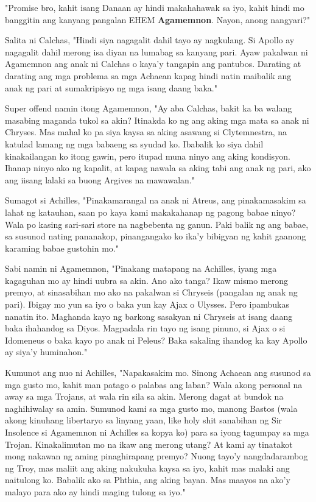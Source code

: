 \documentclass[12pt,letterpaper]{report}
\begin{document}
"Promise bro, kahit isang Danaan ay hindi makahahawak sa iyo,
kahit hindi mo banggitin ang kanyang pangalan EHEM \textbf{Agamemnon}. Nayon, anong nangyari?"

Salita ni Calchas, "Hindi siya nagagalit dahil tayo ay nagkulang.
Si Apollo ay nagagalit dahil merong isa diyan na lumabag sa kanyang pari.
Ayaw pakalwan ni Agamemnon ang anak ni Calchas o kaya'y tangapin ang pantubos.
Darating at darating ang mga problema sa mga Achaean kapag hindi natin maibalik ang anak ng pari at sumakripisyo ng mga isang daang baka."

Super offend namin itong Agamemnon, "Ay aba Calchas, bakit ka ba walang masabing maganda tukol sa akin?
Itinakda ko ng ang aking mga mata sa anak ni Chryses.
Mas mahal ko pa siya kaysa sa aking asawang si Clytemnestra, na katulad lamang ng mga babaeng sa syudad ko.
Ibabalik ko siya dahil kinakailangan ko itong gawin, pero itupad muna ninyo ang aking kondisyon.
Ihanap ninyo ako ng kapalit, at kapag nawala sa aking tabi ang anak ng pari,
ako ang iisang lalaki sa buong Argives na mawawalan."

Sumagot si Achilles, "Pinakamarangal na anak ni Atreus, ang pinakamasakim sa lahat ng katauhan,
saan po kaya kami makakahanap ng pagong babae ninyo? Wala po kasing sari-sari store na nagbebenta ng ganun.
Paki balik ng ang babae, sa susunod nating pananakop, pinangangako ko ika'y bibigyan ng kahit gaanong karaming babae gustohin mo."

Sabi namin ni Agamemnon, "Pinakang matapang na Achilles, iyang mga kagaguhan mo ay hindi uubra sa akin. Ano ako tanga?
Ikaw mismo merong premyo, at sinasabihan mo ako na pakalwan si Chryseis (pangalan ng anak ng pari).
Ibigay mo yun sa iyo o baka yun kay  Ajax o Ulysses. Pero ipambukas nanatin ito.
Maghanda kayo ng barkong sasakyan ni Chryseis at isang daang baka ihahandog sa Diyos. Magpadala rin tayo ng isang pinuno,
si Ajax o si Idomeneus o baka kayo po anak ni Peleus? Baka sakaling ihandog ka kay Apollo ay siya'y huminahon."

Kumunot ang nuo ni Achilles, "Napakasakim mo. Sinong Achaean ang susunod sa mga gusto mo,
kahit man patago o palabas ang laban? Wala akong personal na away sa mga Trojans, at wala rin sila sa akin.
Merong dagat at bundok na naghihiwalay sa amin. Sumunod kami sa mga gusto mo,
manong Bastos (wala akong kinuhang libertaryo sa linyang yaan,
like holy shit sanabihan ng Sir Insolence si Agamemnon ni Achilles sa kopya ko) para sa iyong tagumpay sa mga Trojan.
Kinakalimutan mo na ikaw ang merong utang? At kami ay tinatakot mong nakawan ng aming pinaghirapang premyo?
Nuong tayo'y nangdadarambog ng Troy, mas maliit ang aking nakukuha kaysa sa iyo, kahit mas malaki ang naitulong ko.
Babalik ako sa Phthia, ang aking bayan. Mas maayos na ako'y malayo para ako ay hindi maging tulong sa iyo."
\end{document}

